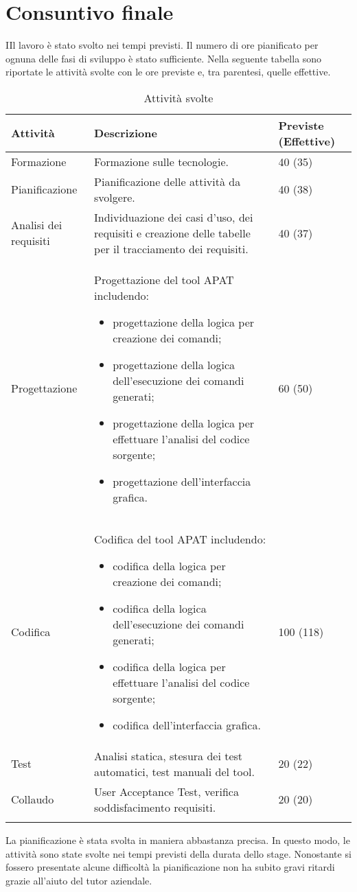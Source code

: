 


\section{Consuntivo finale}\label{sec:consuntivo-finale}
IIl lavoro è stato svolto nei tempi previsti.
Il numero di ore pianificato per ognuna delle fasi di sviluppo è stato sufficiente.
Nella seguente tabella sono riportate le attività svolte con le ore previste e, tra parentesi, quelle effettive.

\begin{longtable}{|C{3cm}|C{8cm}|C{2cm}|}
    \hline
    \textbf{Attività} &
    \textbf{Descrizione} &
    \textbf{Previste} (\textbf{Effettive}) \\\hline
    Formazione     & Formazione sulle tecnologie.
    & 40 (35) \\\hline
    Pianificazione & Pianificazione delle attività da svolgere.
    & 40 (38)    \\\hline
    Analisi dei requisiti & Individuazione dei casi d'uso, dei requisiti e creazione delle tabelle per il tracciamento dei requisiti.
    & 40 (37) \\\hline

    Progettazione & Progettazione del tool APAT includendo:
    \begin{itemize}%
        \item progettazione della logica per creazione dei comandi;
        \item progettazione della logica dell'esecuzione dei comandi generati;
        \item progettazione della logica per effettuare l'analisi del codice sorgente;
        \item progettazione dell'interfaccia grafica.
    \end{itemize}
    &60 (50)\\\hline
    Codifica & Codifica del tool APAT includendo:
    \begin{itemize}%
        \item codifica della logica per creazione dei comandi;
        \item codifica della logica dell'esecuzione dei comandi generati;
        \item codifica della logica per effettuare l'analisi del codice sorgente;
        \item codifica dell'interfaccia grafica.
    \end{itemize}
    & 100 (118) \\\hline
    Test           & Analisi statica, stesura dei test automatici, test manuali del tool.
    & 20 (22)   \\\hline
    Collaudo       & User Acceptance Test, verifica soddisfacimento requisiti.
    & 20 (20)    \\\hline
    \caption{Attività svolte}
\end{longtable}

La pianificazione è stata svolta in maniera abbastanza precisa.
In questo modo, le attività sono state svolte nei tempi previsti della durata dello stage.
Nonostante si fossero presentate alcune difficoltà la pianificazione non ha subito gravi ritardi grazie all’aiuto del tutor aziendale.
